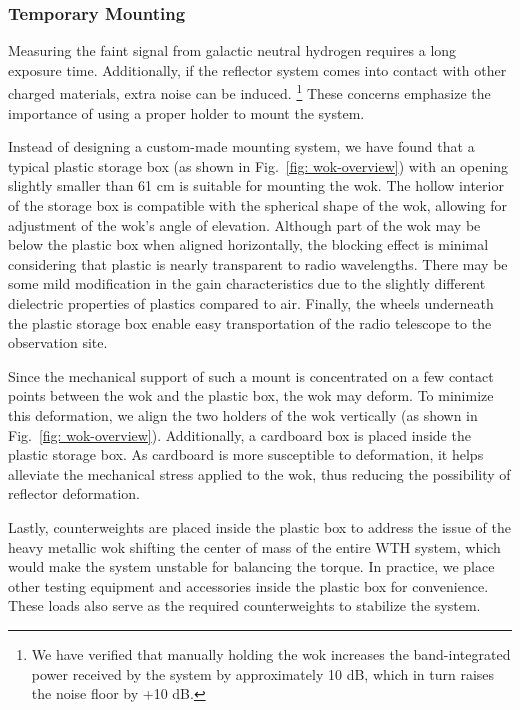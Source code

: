\documentclass[12pt]{article}
\begin{document}
    \subsubsection{Temporary Mounting}
    Measuring the faint signal from galactic neutral hydrogen requires a long exposure time. Additionally, if the reflector system comes into contact with other charged materials, extra noise can be induced. 
    \footnote{We have verified that manually holding the wok increases the band-integrated power received by the system by approximately 10 dB, which in turn raises the noise floor by +10 dB.}
    These concerns emphasize the importance of using a proper holder to mount the system.

    Instead of designing a custom-made mounting system, we have found that a typical plastic storage box (as shown in Fig.~\ref{fig: wok-overview}) with an opening slightly smaller than 61 cm is suitable for mounting the wok. 
    The hollow interior of the storage box is compatible with the spherical shape of the wok, allowing for adjustment of the wok's angle of elevation. Although part of the wok may be below the plastic box when aligned horizontally, the blocking effect is minimal considering that plastic is nearly transparent to radio wavelengths. There may be some mild modification in the gain characteristics due to the slightly different dielectric properties of plastics compared to air. 
    Finally, the wheels underneath the plastic storage box enable easy transportation of the radio telescope to the observation site.
    
    Since the mechanical support of such a mount is concentrated on a few contact points between the wok and the plastic box, the wok may deform. To minimize this deformation, we align the two holders of the wok vertically (as shown in Fig.~\ref{fig: wok-overview}). 
    Additionally, a cardboard box is placed inside the plastic storage box. As cardboard is more susceptible to deformation, it helps alleviate the mechanical stress applied to the wok, thus reducing the possibility of reflector deformation.
    
    Lastly, counterweights are placed inside the plastic box to address the issue of the heavy metallic wok shifting the center of mass of the entire WTH system, which would make the system unstable for balancing the torque. 
    In practice, we place other testing equipment and accessories inside the plastic box for convenience. These loads also serve as the required counterweights to stabilize the system.
\end{document}
